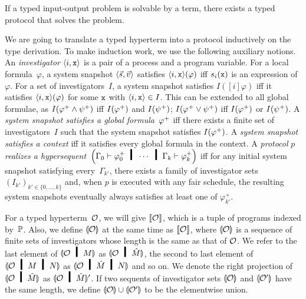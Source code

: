 \begin{theorem}[Soundness]
If a typed input-output problem is solvable by a term,
there exists a typed protocol that solves the problem.
\end{theorem}

We are going to translate a typed hyperterm into a protocol inductively
on the type derivation.
To make induction work, we use the following auxiliary notions.
An \textit{investigator} $\langle{i, \texttt{x}}\rangle$ is a pair of a process and a program
variable.
For a local formula~$\varphi$, a system snapshot $\langle{\vec s,\vec v}\rangle$
satisfies
$\langle{i,\texttt{x}}\rangle(\varphi)$ iff
$s_i(\texttt{x})$ is an expression of $\varphi$.
For a set of investigators~$I$,
a system snapshot satisfies
$I([i]\varphi)$ iff it satisfies
$\langle{i, \texttt{x}}\rangle(\varphi)$ for some $\texttt{x}$ with
$\langle{i,\texttt{x}}\rangle\in I$.
This can be extended to all global formulae, as
$I({\varphi}^+\wedge{\psi}^+)$ iff $I({\varphi}^+)$ and $I({\psi}^+)$;
$I({\varphi}^+\vee{\psi}^+)$ iff $I({\varphi}^+)$ or $I({\psi}^+)$.
A \textit{system snapshot satisfies a global formula}~${\varphi}^+$
iff there exists a
finite set of
investigators~$I$ such that the system snapshot satisfies $I({\varphi}^+)$.
A \textit{system snapshot satisfies a context} iff it
satisfies every global formula in the context.
A \textit{protocol} $p$ \textit{realizes a hypersequent}~$
\left(\Gamma_0\vdash
\m\varphi_0 \hmid \cdots\hmid\Gamma_{k}\vdash \m\varphi_{k}\right)$
iff
for any initial system snapshot satisfying
every~$\Gamma_{k'}$,
there exists a family of investigator sets
$(I_{k'})_{k'\in\{0,\ldots,k\}}$ and,
when $p$ is executed with any fair schedule,
the resulting system snapshots eventually always satisfies at least one of
$\varphi_{k'}^+$.

For a typed 
hyperterm~$\mathcal{O}$,
we will give $\llbracket{\mathcal{O}}\rrbracket$, which is a tuple of programs indexed
by~$\mathbb{P}$.
Also, we define $\llparenthesis{\mathcal{O}}\rrparenthesis$ at the same time as
$\llbracket{\mathcal{O}}\rrbracket$, where
$\llparenthesis{\mathcal{O}}\rrparenthesis$ is a sequence of finite sets of investigators whose
length is the same as that of $\mathcal{O}$.
We refer to the last element of $\semi{\hypert\hmid M}$ as
$\semi{\hypert\hmid \hat{M}}$, the second to last element of
$\semi{\hypert\hmid M\hmid N}$ as 
$\semi{\hypert\hmid \hat M\hmid N}$ and so on.
We denote the right projection of $\semi{\hypert\hmid \hat{M}}$ as
$\semi{\hypert\hmid \hat{M}}'$.
If two sequents of investigator sets $\llparenthesis{\mathcal{O}}\rrparenthesis$ and $\llparenthesis{\mathcal{O}'}\rrparenthesis$
have the same length, we define $\llparenthesis{\mathcal{O}}\rrparenthesis\cup \llparenthesis{\mathcal{O}'}\rrparenthesis$ to
be the elementwise union.

